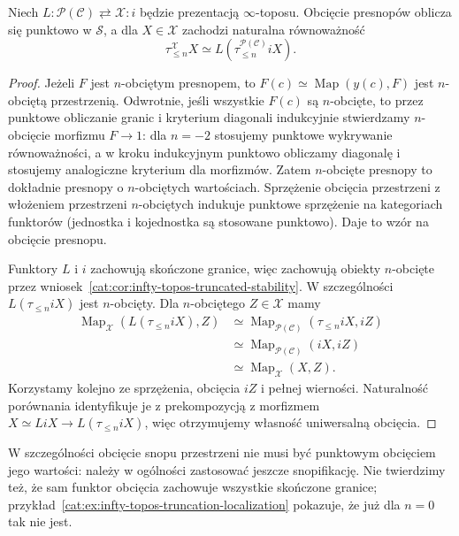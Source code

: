 \begin{stwierdzenie}\label{cat:prop:infty-topos-truncation-presentation}
Niech $L:\mathcal P(\mathcal C)\rightleftarrows\mathcal X:i$ będzie prezentacją $\infty$-toposu. Obcięcie presnopów oblicza się punktowo w $\mathcal S$, a dla $X\in\mathcal X$ zachodzi naturalna równoważność
\[
 \tau_{\leq n}^{\mathcal X}X\simeq L(\tau_{\leq n}^{\mathcal P(\mathcal C)}iX).
\]
\end{stwierdzenie}
\begin{proof}
Jeżeli $F$ jest $n$-obciętym presnopem, to $F(c)\simeq\operatorname{Map}(y(c),F)$ jest $n$-obciętą przestrzenią. Odwrotnie, jeśli wszystkie $F(c)$ są $n$-obcięte, to przez punktowe obliczanie granic i kryterium diagonali indukcyjnie stwierdzamy $n$-obcięcie morfizmu $F\to1$: dla $n=-2$ stosujemy punktowe wykrywanie równoważności, a w kroku indukcyjnym punktowo obliczamy diagonalę i stosujemy analogiczne kryterium dla morfizmów. Zatem $n$-obcięte presnopy to dokładnie presnopy o $n$-obciętych wartościach. Sprzężenie obcięcia przestrzeni z włożeniem przestrzeni $n$-obciętych indukuje punktowe sprzężenie na kategoriach funktorów (jednostka i kojednostka są stosowane punktowo). Daje to wzór na obcięcie presnopu.

Funktory $L$ i $i$ zachowują skończone granice, więc zachowują obiekty $n$-obcięte przez wniosek~\ref{cat:cor:infty-topos-truncated-stability}. W szczególności $L(\tau_{\leq n}iX)$ jest $n$-obcięty. Dla $n$-obciętego $Z\in\mathcal X$ mamy
\[
\begin{aligned}
 \operatorname{Map}_{\mathcal X}(L(\tau_{\leq n}iX),Z)
 &\simeq\operatorname{Map}_{\mathcal P(\mathcal C)}(\tau_{\leq n}iX,iZ)\\
 &\simeq\operatorname{Map}_{\mathcal P(\mathcal C)}(iX,iZ)\\
 &\simeq\operatorname{Map}_{\mathcal X}(X,Z).
\end{aligned}
\]
Korzystamy kolejno ze sprzężenia, obcięcia $iZ$ i pełnej wierności. Naturalność porównania identyfikuje je z prekompozycją z morfizmem $X\simeq LiX\to L(\tau_{\leq n}iX)$, więc otrzymujemy własność uniwersalną obcięcia.
\end{proof}

W szczególności obcięcie snopu przestrzeni nie musi być punktowym obcięciem jego wartości: należy w ogólności zastosować jeszcze snopifikację. Nie twierdzimy też, że sam funktor obcięcia zachowuje wszystkie skończone granice; przykład~\ref{cat:ex:infty-topos-truncation-localization} pokazuje, że już dla $n=0$ tak nie jest.

